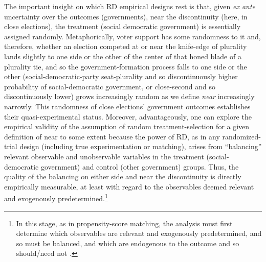 \documentclass[12pt]{article}
\begin{document}
The important insight on which RD empirical designs rest is that, given \textit{ex ante} uncertainty over the outcomes (governments), near the discontinuity (here, in close elections), the treatment (social democratic government) is essentially assigned randomly. Metaphorically, voter support has some randomness to it and, therefore, whether an election competed at or near the knife-edge of plurality lands slightly to one side or the other of the center of that honed blade of a plurality tie, and so the government-formation process falls to one side or the other (social-democratic-party seat-plurality and so discontinuously higher probability of social-democratic government, or close-second and so discontinuously lower) grows increasingly random as we define \textit{near} increasingly narrowly. This randomness of close elections' government outcomes establishes their quasi-experimental status. Moreover, advantageously, one can explore the empirical validity of the assumption of random treatment-selection for a given definition of near to some extent because the power of RD, as in any randomized-trial design (including true experimentation or matching), arises from ``balancing'' relevant observable and unobservable variables in the treatment (social-democratic government) and control (other government) groups. Thus, the quality of the balancing on either side and near the discontinuity is directly empirically measurable, at least with regard to the observables deemed relevant and exogenously predetermined.\footnote{In this stage, as in propensity-score matching, the analysis must first determine which observables are relevant and exogenously predetermined, and so must be balanced, and which are endogenous to the outcome and so should/need not \citep{Diamond2012}.} 
\end{document}
